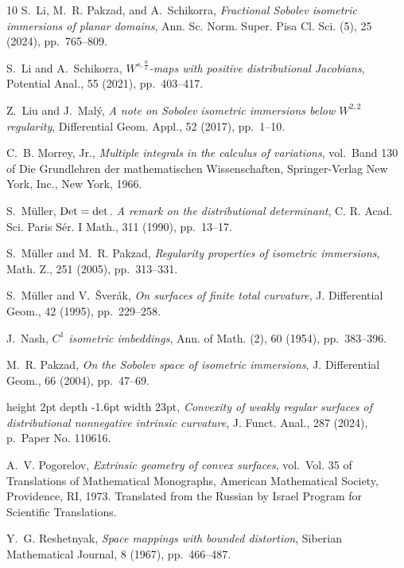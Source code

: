 \documentclass[12pt]{article}
\theoremstyle{plain}
\numberwithin{equation}{section}
\begin{document}
\begin{thebibliography}{10}
{\sc S.~Li, M.~R. Pakzad, and A.~Schikorra}, {\em Fractional {S}obolev
  isometric immersions of planar domains}, Ann. Sc. Norm. Super. Pisa Cl. Sci.
  (5), 25 (2024), pp.~765--809.

{\sc S.~Li and A.~Schikorra}, {\em {$W^{s,\frac ns}$}-maps with positive
  distributional {J}acobians}, Potential Anal., 55 (2021), pp.~403--417.

{\sc Z.~Liu and J.~Mal\'y}, {\em A note on {S}obolev isometric immersions below
  {$W^{2,2}$} regularity}, Differential Geom. Appl., 52 (2017), pp.~1--10.

{\sc C.~B. Morrey, Jr.}, {\em Multiple integrals in the calculus of
  variations}, vol.~Band 130 of Die Grundlehren der mathematischen
  Wissenschaften, Springer-Verlag New York, Inc., New York, 1966.

{\sc S.~M\"uller}, {\em {${\rm Det}={\rm det}$}. {A} remark on the
  distributional determinant}, C. R. Acad. Sci. Paris S\'er. I Math., 311
  (1990), pp.~13--17.

{\sc S.~M\"{u}ller and M.~R. Pakzad}, {\em Regularity properties of isometric
  immersions}, Math. Z., 251 (2005), pp.~313--331.

{\sc S.~M\"uller and V.~\v{S}ver\'{a}k}, {\em On surfaces of finite total
  curvature}, J. Differential Geom., 42 (1995), pp.~229--258.

{\sc J.~Nash}, {\em {$C^1$} isometric imbeddings}, Ann. of Math. (2), 60
  (1954), pp.~383--396.

{\sc M.~R. Pakzad}, {\em On the {S}obolev space of isometric immersions}, J.
  Differential Geom., 66 (2004), pp.~47--69.

\leavevmode\vrule height 2pt depth -1.6pt width 23pt, {\em Convexity of weakly
  regular surfaces of distributional nonnegative intrinsic curvature}, J.
  Funct. Anal., 287 (2024), p.~Paper No. 110616.

{\sc A.~V. Pogorelov}, {\em Extrinsic geometry of convex surfaces}, vol.~Vol.
  35 of Translations of Mathematical Monographs, American Mathematical Society,
  Providence, RI, 1973.
\newblock Translated from the Russian by Israel Program for Scientific
  Translations.

{\sc Y.~G. Reshetnyak}, {\em Space mappings with bounded distortion}, Siberian
  Mathematical Journal, 8 (1967), pp.~466--487.


\end{thebibliography}
\end{document}
